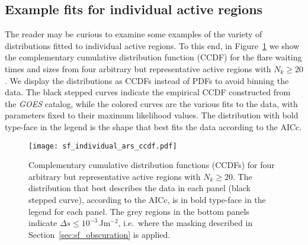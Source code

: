 \begin{subappendices}
\section{Example fits for individual active regions} \label{app:sf_perar}
The reader may be curious to examine some examples of the variety of distributions fitted to individual active regions. To this end, in Figure~\ref{fig:sf_perar} we show the complementary cumulative distribution function (CCDF) for the flare waiting times and sizes from four arbitrary but representative active regions with $N_k \geq 20$. We display the distributions as CCDFs instead of PDFs to avoid binning the data. The black stepped curves indicate the empirical CCDF constructed from the \emph{GOES} catalog, while the colored curves are the various fits to the data, with parameters fixed to their maximum likelihood values. The distribution with bold type-face in the legend is the shape that best fits the data according to the AICc.

\begin{figure}
    \centering
    \texttt{[image: sf\_individual\_ars\_ccdf.pdf]}
    \caption{Complementary cumulative distribution functions (CCDFs) for four arbitrary but representative active regions with $N_k \geq 20$. The distribution that best describes the data in each panel (black stepped curve), according to the AICc, is in bold type-face in the legend for each panel. The grey regions in the bottom panels indicate $\Delta s \leq 10^{-3}\,$Jm$^{-2}$, i.e.~where the masking described in Section~\ref{sec:sf_obscuration} is applied.}
    \label{fig:sf_perar}
\end{figure}



\end{subappendices}
